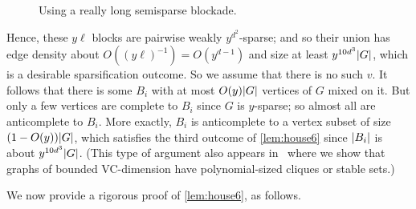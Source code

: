 \documentclass[11pt,reqno,a4paper]{amsart}
\DeclarePairedDelimiter\abs{\lvert}{\rvert}%
\begin{document}
\begin{figure}[ht]
		
		\caption{Using a really long semisparse blockade.}
		\label{fig:conductor}
	\end{figure}
	
	Hence, these $y\ell$ blocks are pairwise weakly $y^{d^2}$-sparse; and so their union has edge density about $O((y\ell)^{-1})=O(y^{d-1})$ and size at least $y^{10d^3}\abs G$, which is a desirable sparsification outcome.
	So we assume that there is no such $v$. It follows that 
	there is some $B_i$ with at most $O(y)\abs G$ vertices of $G$ mixed on it. But only a few vertices are complete to $B_i$
	since $G$ is $y$-sparse; so almost all are anticomplete to $B_i$. More exactly, 
	$B_i$ is anticomplete to a vertex subset of size $(1-O(y))\abs G$, 
	which satisfies the third outcome of \cref{lem:house6} since $\abs{B_i}$ is about $y^{10d^3}\abs G$.
	(This type of argument also appears in~\cite{density6} where we show that graphs of bounded VC-dimension have polynomial-sized cliques or stable sets.)
	
	
	
	We now provide a rigorous proof of \cref{lem:house6}, as follows.
	
\end{document}
